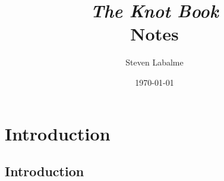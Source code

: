 \documentclass[titlepage]{article}
\title{{\Huge\emph{The Knot Book}}\\[5pt]\textcolor{gray!60!black}{Notes}\vspace{-0.5em}}
\author{Steven Labalme}
\date{\today}
\numberwithin{figure}{section}
\numberwithin{table}{section}
\numberwithin{equation}{section}
\begin{document}
\maketitle



\tableofcontents
\listoffigures
\listoftables
\newpage



\pagestyle{fancy}
\fancyhf{}
\renewcommand{\headrulewidth}{0pt}
\section{Introduction}\label{sse:intro}
\subsection{Introduction}\label{sss:Introduction}
\end{document}
